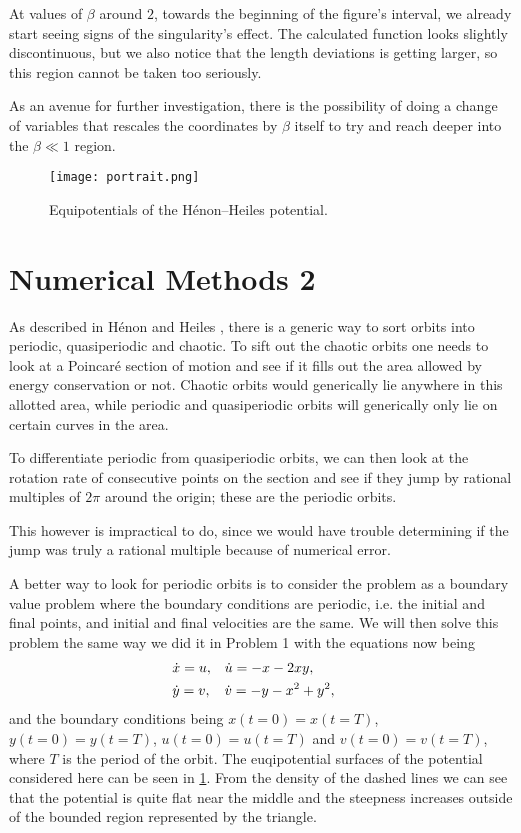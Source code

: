 \documentclass[10pt,a4paper,twocolumn]{article}
\begin{document}
At values of $\beta$ around $2$, towards the beginning of the figure's interval, we already start seeing signs of the singularity's effect. The calculated function looks slightly discontinuous, but we also notice that the length deviations is getting larger, so this region cannot be taken too seriously.

As an avenue for further investigation, there is the possibility of doing a change of variables that rescales the coordinates by $\beta$ itself to try and reach deeper into the $\beta \ll 1$ region.

\begin{figure}[!h]
    \centering
    \texttt{[image: portrait.png]}
    \caption{Equipotentials of the H\'enon--Heiles potential.}
    \label{fig:portrait}
\end{figure}

\section{Numerical Methods 2}

As described in H\'enon and Heiles \cite{hh}, there is a generic way to sort orbits into periodic, quasiperiodic and chaotic. To sift out the chaotic orbits one needs to look at a Poincar\'e section of motion and see if it fills out the area allowed by energy conservation or not. Chaotic orbits would generically lie anywhere in this allotted area, while periodic and quasiperiodic orbits will generically only lie on certain curves in the area. 

To differentiate periodic from quasiperiodic orbits, we can then look at the rotation rate of consecutive points on the section and see if they jump by rational multiples of $2 \pi$ around the origin; these are the periodic orbits.

This however is impractical to do, since we would have trouble determining if the jump was truly a rational multiple because of numerical error.

A better way to look for periodic orbits is to consider the problem as a boundary value problem where the boundary conditions are periodic, i.e. the initial and final points, and initial and final velocities are the same. We will then solve this problem the same way we did it in Problem 1 with the equations now being
%
\begin{align}
    &\dot{x} = u,& &\dot{u} = -x -2xy,& \notag\\
    &\dot{y} = v,& &\dot{v} = -y - x^2 + y^2,&
\end{align}
%
and the boundary conditions being $x(t=0) = x(t=T)$, $y(t=0) = y(t=T)$, $u(t=0) = u(t=T)$ and $v(t=0) = v(t=T)$, where $T$ is the period of the orbit. The euqipotential surfaces of the potential considered here can be seen in \cref{fig:portrait}. From the density of the dashed lines we can see that the potential is quite flat near the middle and the steepness increases outside of the bounded region represented by the triangle. 
\end{document}
